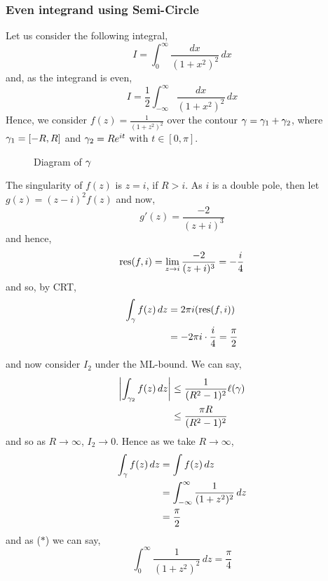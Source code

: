 \documentclass{article}
\begin{document}
\subsubsection{Even integrand using Semi-Circle}


Let us consider the following integral,
$$ I = \int_0^{\infty} {\frac{dx}{(1 + x^2)^2}}\,dx $$
and, as the integrand is even,
\begin{equation*}
  I = \frac{1}{2}\int_{-\infty}^\infty {\frac{dx}{(1 + x^2)^2}}\,dx \tag{$*$}
\end{equation*}
Hence, we consider $f(z) = \frac{1}{(1 + z^2)^2}$ over the contour $\gamma = \gamma_1 + \gamma_2$, where $\gamma_1 = [-R, R]$ and $\gamma_2 = Re^{it}$ with $t \in [0, \pi]$.

\begin{figure}[!ht]
  \centering
  \caption{Diagram of $\gamma$}
\end{figure}

The singularity of $f(z)$ is $z = i$, if $R > i$. As $i$ is a double pole, then let $g(z) = (z - i)^2 f(z)$ and now,
$$ g'(z) = \frac{-2}{(z + i)^3} $$
and hence,
$$ \operatorname*{res} (f, i) = \lim_{z \to i} {\frac{-2}{(z + i)^3}} = -\frac{i}{4}$$
and so, by CRT,
\begin{align*}
  \int_\gamma f(z)\,dz &= 2\pi i (\operatorname*{res} (f, i))\\
  &= -2\pi i \cdot \frac{i}{4} = \frac{\pi}{2}
\end{align*}

and now consider $I_2$ under the ML-bound. We can say,
\begin{align*}
  \left | \int_{\gamma_2} f(z)\,dz \right | &\le \frac{1}{(R^2 - 1)^2} \ell{(\gamma)} \\
  &\le \frac{\pi R}{(R^2 - 1)^2}
\end{align*}
and so as $R \to \infty$, $I_2 \to 0$. Hence as we take $R \to \infty$,
\begin{align*}
  \int_\gamma f(z)\,dz &= \int f(z)\,dz\\
  &= \int_{-\infty}^\infty \frac{1}{(1 + z^2)^2} \,dz\\
  &= \frac{\pi}{2}
\end{align*}
and as ($*$) we can say,
$$ \int_0^\infty \frac{1}{(1 + z^2)^2} \,dz = \frac{\pi}{4}$$
\end{document}
